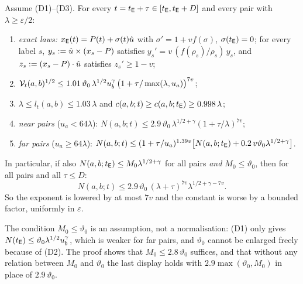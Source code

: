 \begin{theorem}\label{thm:E-dep}
Assume \textup{(D1)--(D3)}. For every $t=t_{\mathsf E}+\tau\in[t_{\mathsf E},t_{\mathsf E}+D]$ and every pair with $\lambda\ge\varepsilon/2$:
\begin{enumerate}
\item[(i)] \emph{exact laws:} $x_{\mathsf E}(t)=P(t)+\sigma(t)\hat u$ with $\sigma'=1+vf(\sigma)$, $\sigma(t_{\mathsf E})=0$; for every label $s$,
$y_s:=\hat u\times(x_s-P)$ satisfies $y_s'=v\,(f(\rho_s)/\rho_s)\,y_s$, and $z_s:=(x_s-P)\cdot\hat u$ satisfies $z_s'\ge1-v$;
\item[(ii)] $\mathcal V_t(a,b)^{1/2}\le1.01\,\vartheta_0\,\lambda^{1/2}u_b^\gamma\,\bigl(1+\tau/\max(\lambda,u_a)\bigr)^{7v}$;
\item[(iii)] $\lambda\le l_t(a,b)\le1.03\,\lambda$ and $c(a,b;t)\ge c(a,b;t_{\mathsf E})\ge0.998\,\lambda$;
\item[(iv)] \emph{near pairs} ($u_a<64\lambda$): $N(a,b;t)\le2.9\,\vartheta_0\,\lambda^{1/2+\gamma}(1+\tau/\lambda)^{7v}$;
\item[(v)] \emph{far pairs} ($u_a\ge64\lambda$):
$N(a,b;t)\le(1+\tau/u_a)^{1.39v}\bigl[N(a,b;t_{\mathsf E})+0.2\,v\vartheta_0\lambda^{1/2+\gamma}\bigr]$.
\end{enumerate}
In particular, if also $N(a,b;t_{\mathsf E})\le M_0\lambda^{1/2+\gamma}$ for all pairs \emph{and $M_0\le\vartheta_0$}, then for all pairs and
all $\tau\le D$:
\[
N(a,b;t)\le2.9\,\vartheta_0\,(\lambda+\tau)^{7v}\lambda^{1/2+\gamma-7v} .
\]
So the exponent is lowered by at most $7v$ and the constant is worse by a bounded factor, uniformly in $\varepsilon$.
\end{theorem}
The condition $M_0\le\vartheta_0$ is an assumption, not a normalisation: (D1) only gives
$N(t_{\mathsf E})\le\vartheta_0\lambda^{1/2}u_b^\gamma$, which is weaker for far pairs, and $\vartheta_0$ cannot be enlarged freely because of
(D2). The proof shows that $M_0\le2.8\,\vartheta_0$ suffices, and that without any relation between $M_0$ and $\vartheta_0$ the last
display holds with $2.9\max(\vartheta_0,M_0)$ in place of $2.9\,\vartheta_0$.

